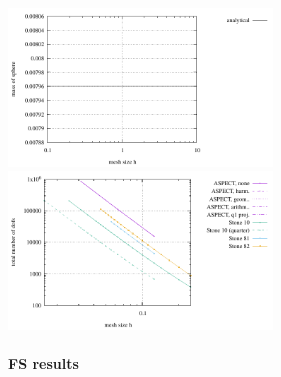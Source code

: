 \includegraphics[width=7cm]{images/stokes_sphere3D/mass_sphere}
\includegraphics[width=7cm]{images/stokes_sphere3D/dofs}

\newpage
\paragraph{FS results}

